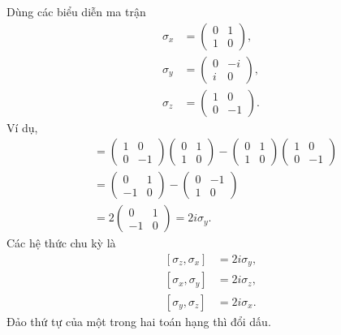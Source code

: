 Dùng các biểu diễn ma trận
\begin{equation}
\begin{aligned}
\sigma_x&=
\begin{pmatrix}0&1\\1&0\end{pmatrix},\\[0.4em]
\sigma_y&=
\begin{pmatrix}0&-i\\i&0\end{pmatrix},\\[0.4em]
\sigma_z&=
\begin{pmatrix}1&0\\0&-1\end{pmatrix}.
\end{aligned}
\end{equation}
Ví dụ,
\begin{align}
[\sigma_z,\sigma_x]
&=
\begin{pmatrix}1&0\\0&-1\end{pmatrix}
\begin{pmatrix}0&1\\1&0\end{pmatrix}
-
\begin{pmatrix}0&1\\1&0\end{pmatrix}
\begin{pmatrix}1&0\\0&-1\end{pmatrix}\\
&=
\begin{pmatrix}0&1\\-1&0\end{pmatrix}
-
\begin{pmatrix}0&-1\\1&0\end{pmatrix}\\
&=2
\begin{pmatrix}0&1\\-1&0\end{pmatrix}
=2i\sigma_y.
\end{align}
Các hệ thức chu kỳ là
\begin{equation}
\begin{aligned}
[\sigma_z,\sigma_x]&=2i\sigma_y,\\
[\sigma_x,\sigma_y]&=2i\sigma_z,\\
[\sigma_y,\sigma_z]&=2i\sigma_x.
\end{aligned}
\label{eq:l5-pauli-commutators}
\end{equation}
Đảo thứ tự của một trong hai toán hạng thì đổi dấu.

